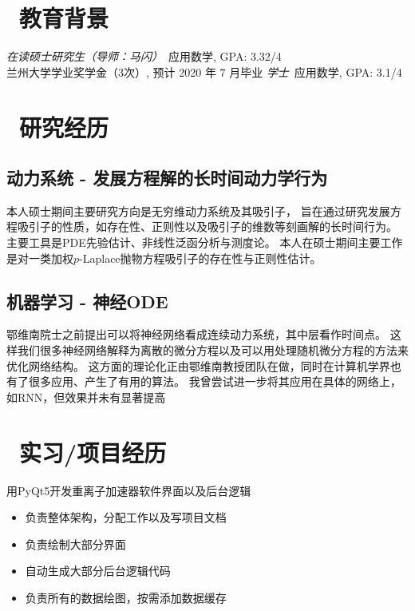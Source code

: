 \documentclass{resume}
\begin{document}


 
\section{\faGraduationCap\  教育背景}
\datedsubsection{\textbf{兰州大学}, 兰州, 甘肃}{2017 -- 至今}
\textit{在读硕士研究生（导师：马闪）}\ 应用数学, GPA: 3.32/4\\
兰州大学学业奖学金（3次）, 预计 2020 年 7 月毕业
\textit{学士}\ 应用数学, GPA: 3.1/4

\section{\faFlask\ 研究经历}
\subsection{\textbf{动力系统 - 发展方程解的长时间动力学行为}}
\begin{onehalfspacing}
本人硕士期间主要研究方向是无穷维动力系统及其吸引子，
旨在通过研究发展方程吸引子的性质，如存在性、正则性以及吸引子的维数等刻画解的长时间行为。
主要工具是PDE先验估计、非线性泛函分析与测度论。
本人在硕士期间主要工作是对一类加权$p$-Laplace抛物方程吸引子的存在性与正则性估计。
\end{onehalfspacing}

\subsection{\textbf{机器学习 - 神经ODE}}
鄂维南院士之前提出可以将神经网络看成连续动力系统，其中层看作时间点。
这样我们很多神经网络解释为离散的微分方程以及可以用处理随机微分方程的方法来优化网络结构。
这方面的理论化正由鄂维南教授团队在做，同时在计算机学界也有了很多应用、产生了有用的算法。
我曾尝试进一步将其应用在具体的网络上，如RNN，但效果并未有显著提高

\section{\faUsers\ 实习/项目经历}
\begin{onehalfspacing}
用PyQt5开发重离子加速器软件界面以及后台逻辑
\begin{itemize}
  \item 负责整体架构，分配工作以及写项目文档
  \item 负责绘制大部分界面
  \item 自动生成大部分后台逻辑代码
  \item 负责所有的数据绘图，按需添加数据缓存
\end{itemize}
\end{onehalfspacing}
\end{document}
